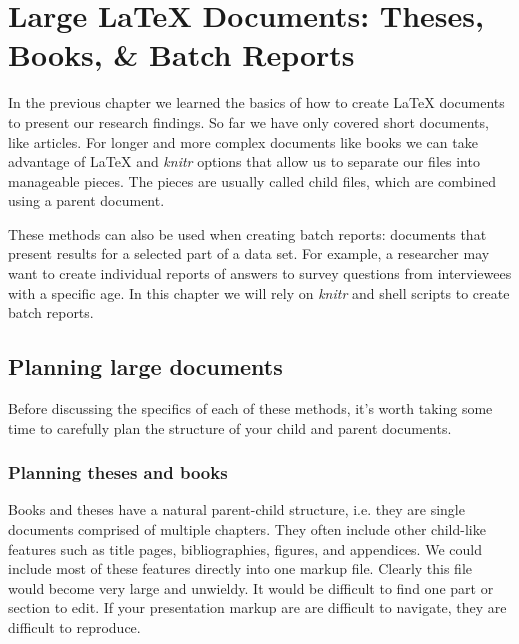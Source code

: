 



\chapter{Large LaTeX Documents: Theses, Books, \& Batch Reports}\label{LargeDocs}


In the previous chapter we learned the basics of how to create LaTeX documents to present our research findings. So far we have only covered short documents, like articles. For longer and more complex documents like books we can take advantage of LaTeX and {\emph{knitr}} options that allow us to separate our files into manageable pieces. The pieces are usually called child files, which are combined using a parent document.

These methods can also be used when creating batch reports: documents that present results for a selected part of a data set. For example, a researcher may want to create individual reports of answers to survey questions from interviewees with a specific age. In this chapter we will rely on {\emph{knitr}} and shell scripts to create batch reports. 

\section{Planning large documents}

Before discussing the specifics of each of these methods, it's worth taking some time to carefully plan the structure of your child and parent documents.

\subsection{Planning theses and books}

Books and theses have a natural parent-child structure, i.e. they are single documents comprised of multiple chapters. They often include other child-like features such as title pages, bibliographies, figures, and appendices. We could include most of these features directly into one markup file. Clearly this file would become very large and unwieldy. It would be difficult to find one part or section to edit. If your presentation markup are are difficult to navigate, they are difficult to reproduce.  

